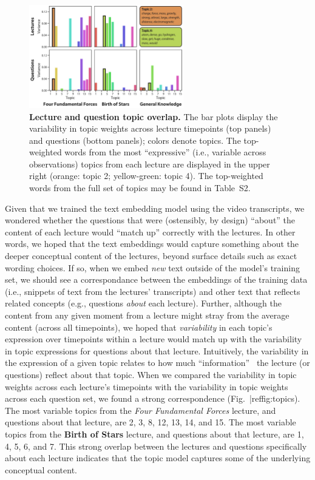 \documentclass[10pt]{article}
\newcommand{\topics}{S2}
\begin{document}
\begin{figure}[tp]
    \centering
    \includegraphics[width=0.6\textwidth]{figs/active-topics}
    
\caption{\textbf{Lecture and question topic overlap.} The bar plots display the
variability in topic weights across lecture timepoints (top panels) and
questions (bottom panels); colors denote topics. The top-weighted words from
the most ``expressive'' (i.e., variable across observations) topics from each
lecture are displayed in the upper right (orange: topic 2; yellow-green: topic
4). The top-weighted words from the full set of topics may be found in
Table~\topics.}
    
    \label{fig:topics}
\end{figure}


Given that we trained the text embedding model using the video transcripts, we
wondered whether the questions that were (ostensibly, by design) ``about'' the
content of each lecture would ``match up'' correctly with the lectures. In
other words, we hoped that the text embeddings would capture something about
the deeper conceptual content of the lectures, beyond surface details such as
exact wording choices. If so, when we embed \textit{new} text outside of the
model's training set, we should see a correspondance between the embeddings of
the training data (i.e., snippets of text from the lectures' transcripts) and
other text that reflects related concepts (e.g., questions \textit{about} each
lecture). Further, although the content from any given moment from a lecture
might stray from the average content (across all timepoints), we hoped that
\textit{variability} in each topic's expression over timepoints within a
lecture would match up with the variability in topic expressions for questions
about that lecture. Intuitively, the variability in the expression of a given
topic relates to how much ``information''~\citep{Fish22} the lecture (or
questions) reflect about that topic. When we compared the variability in topic
weights across each lecture's timepoints with the variability in topic weights
across each question set, we found a strong correspondence
(Fig.~|ref{fig:topics}). The most variable topics from the \textit{Four
Fundamental Forces} lecture, and questions about that lecture, are 2, 3, 8, 12,
13, 14, and 15. The most variable topics from the \textbf{Birth of Stars}
lecture, and questions about that lecture, are 1, 4, 5, 6, and 7. This strong
overlap between the lectures and questions specifically about each lecture
indicates that the topic model captures some of the underlying conceptual
content.
\end{document}
